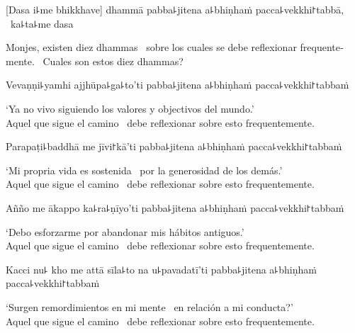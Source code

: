 
\begin{leader}
\end{leader}

[Dasa i꜕me bhikkhave] dhammā pabba꜕jitena a꜕bhiṇhaṁ pacca꜕vekkhi꜓tabbā, \pause\ ka꜕ta꜕me dasa

\begin{english}
  Monjes, existen diez dhammas \pause\ sobre los cuales se debe reflexionar frequentemente. \pause\ Cuales son estos diez dhammas?
\end{english}

Vevaṇṇi꜕yamhi ajjhūpa꜕ga꜕to'ti pabba꜕jitena a꜕bhiṇhaṁ pacca꜕vekkhi꜓tabbaṁ

\begin{english}
  `Ya no vivo siguiendo los valores y objectivos del mundo.' \pause\\
  Aquel que sigue el camino \pause\ debe reflexionar sobre esto frequentemente.
\end{english}

Parapaṭi꜕baddhā me jīvi꜓kā'ti pabba꜕jitena a꜕bhiṇhaṁ pacca꜕vekkhi꜓tabbaṁ

\begin{english}
  `Mi propria vida es sostenida \pause\ por la generosidad de los demás.' \pause\\
  Aquel que sigue el camino \pause\ debe reflexionar sobre esto frequentemente.
\end{english}

Añño me ākappo ka꜕ra꜕ṇīyo'ti pabba꜕jitena a꜕bhiṇhaṁ pacca꜕vekkhi꜓tabbaṁ

\begin{english}
  `Debo esforzarme por abandonar mis hábitos antiguos.' \pause\\
  Aquel que sigue el camino \pause\ debe reflexionar sobre esto frequentemente.
\end{english}

\clearpage

Kacci nu꜕ kho me attā sīla꜕to na u꜕pavadatī'ti pabba꜕jitena a꜕bhiṇhaṁ pacca꜕vekkhi꜓tabbaṁ

\begin{english}
  `Surgen remordimientos en mi mente \pause\ en relación a mi conducta?' \pause\\
  Aquel que sigue el camino \pause\ debe reflexionar sobre esto frequentemente.
\end{english}


